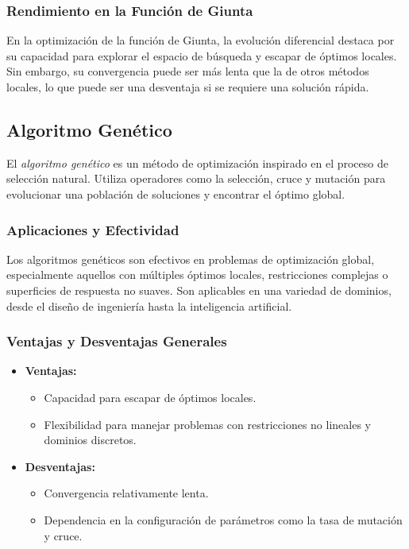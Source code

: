 \documentclass[fontsize=10pt]{article}
\begin{document}
\subsubsection{Rendimiento en la Función de Giunta}

En la optimización de la función de Giunta, la evolución diferencial destaca por su capacidad para explorar el espacio de búsqueda y escapar de óptimos locales. Sin embargo, su convergencia puede ser más lenta que la de otros métodos locales, lo que puede ser una desventaja si se requiere una solución rápida.

\subsection{Algoritmo Genético}

El \textit{algoritmo genético} es un método de optimización inspirado en el proceso de selección natural. Utiliza operadores como la selección, cruce y mutación para evolucionar una población de soluciones y encontrar el óptimo global.

\subsubsection{Aplicaciones y Efectividad}

Los algoritmos genéticos son efectivos en problemas de optimización global, especialmente aquellos con múltiples óptimos locales, restricciones complejas o superficies de respuesta no suaves. Son aplicables en una variedad de dominios, desde el diseño de ingeniería hasta la inteligencia artificial.

\subsubsection{Ventajas y Desventajas Generales}

\begin{itemize}
    \item \textbf{Ventajas:} 
    \begin{itemize}
        \item Capacidad para escapar de óptimos locales.
        \item Flexibilidad para manejar problemas con restricciones no lineales y dominios discretos.
    \end{itemize}
    \item \textbf{Desventajas:} 
    \begin{itemize}
        \item Convergencia relativamente lenta.
        \item Dependencia en la configuración de parámetros como la tasa de mutación y cruce.
    \end{itemize}
\end{itemize}
\end{document}

